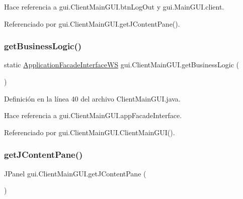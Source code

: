 Hace referencia a gui.\+Client\+Main\+G\+U\+I.\+btn\+Log\+Out y gui.\+Main\+G\+U\+I.\+client.



Referenciado por gui.\+Client\+Main\+G\+U\+I.\+get\+J\+Content\+Pane().

\mbox{\label{classgui_1_1_client_main_g_u_i_a66e91e37a334a0d931f9a448e032091c}} 
\subsubsection{\texorpdfstring{getBusinessLogic()}{getBusinessLogic()}}
{\footnotesize\ttfamily static \mbox{\hyperlink{interfacebusiness_logic_1_1_application_facade_interface_w_s}{Application\+Facade\+Interface\+WS}} gui.\+Client\+Main\+G\+U\+I.\+get\+Business\+Logic (\begin{DoxyParamCaption}{ }\end{DoxyParamCaption})\hspace{0.3cm}{\ttfamily [static]}}



Definición en la línea 40 del archivo Client\+Main\+G\+U\+I.\+java.


\begin{DoxyCode}{0}

\end{DoxyCode}


Hace referencia a gui.\+Client\+Main\+G\+U\+I.\+app\+Facade\+Interface.



Referenciado por gui.\+Client\+Main\+G\+U\+I.\+Client\+Main\+G\+U\+I().

\mbox{\label{classgui_1_1_client_main_g_u_i_a60789fece2ec731726a04b1a48f311c1}} 
\subsubsection{\texorpdfstring{getJContentPane()}{getJContentPane()}}
{\footnotesize\ttfamily J\+Panel gui.\+Client\+Main\+G\+U\+I.\+get\+J\+Content\+Pane (\begin{DoxyParamCaption}{ }\end{DoxyParamCaption})\hspace{0.3cm}{\ttfamily [private]}}



